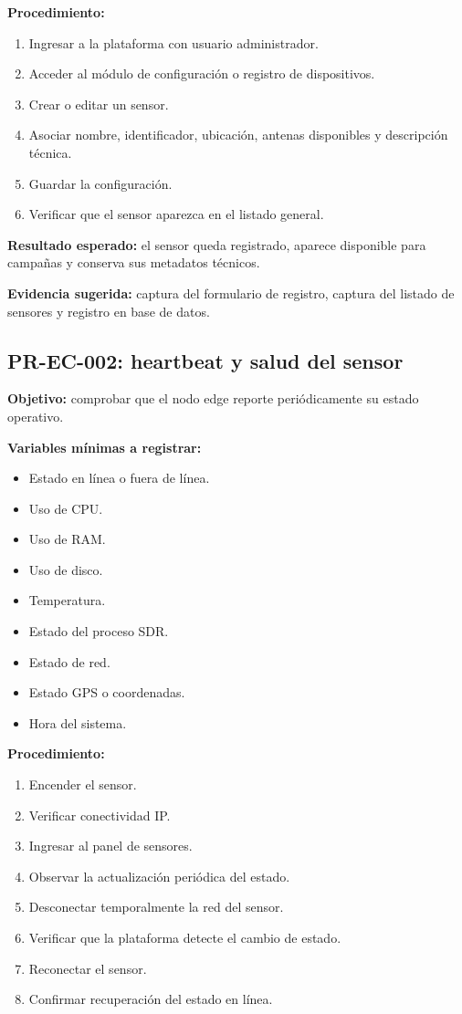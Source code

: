 \textbf{Procedimiento:}

\begin{enumerate}
    \item Ingresar a la plataforma con usuario administrador.
    \item Acceder al módulo de configuración o registro de dispositivos.
    \item Crear o editar un sensor.
    \item Asociar nombre, identificador, ubicación, antenas disponibles y descripción técnica.
    \item Guardar la configuración.
    \item Verificar que el sensor aparezca en el listado general.
\end{enumerate}

\textbf{Resultado esperado:} el sensor queda registrado, aparece disponible para campañas y conserva sus metadatos técnicos.

\textbf{Evidencia sugerida:} captura del formulario de registro, captura del listado de sensores y registro en base de datos.

\subsection{PR-EC-002: heartbeat y salud del sensor}

\textbf{Objetivo:} comprobar que el nodo edge reporte periódicamente su estado operativo.

\textbf{Variables mínimas a registrar:}

\begin{itemize}
    \item Estado en línea o fuera de línea.
    \item Uso de CPU.
    \item Uso de RAM.
    \item Uso de disco.
    \item Temperatura.
    \item Estado del proceso SDR.
    \item Estado de red.
    \item Estado GPS o coordenadas.
    \item Hora del sistema.
\end{itemize}

\textbf{Procedimiento:}

\begin{enumerate}
    \item Encender el sensor.
    \item Verificar conectividad IP.
    \item Ingresar al panel de sensores.
    \item Observar la actualización periódica del estado.
    \item Desconectar temporalmente la red del sensor.
    \item Verificar que la plataforma detecte el cambio de estado.
    \item Reconectar el sensor.
    \item Confirmar recuperación del estado en línea.
\end{enumerate}

